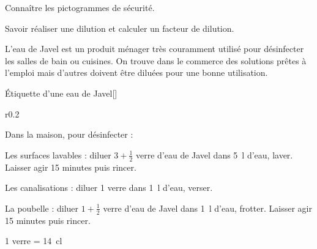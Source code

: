 \tetePremStssChim
\vspace*{-36pt}

\begin{objectifs}
  \item Connaître les pictogrammes de sécurité.
  \item Savoir réaliser une dilution et calculer un facteur de dilution.
\end{objectifs}





\newpage
\vspace*{-30pt}
\begin{contexte}
  L'eau de Javel est un produit ménager très couramment utilisé pour désinfecter les salles de bain ou cuisines.
  On trouve dans le commerce des solutions prêtes à l’emploi mais d’autres
doivent être diluées pour une bonne utilisation.

\end{contexte}

\begin{doc}{Étiquette d'une eau de Javel}[\label{doc:eau_javel}]
  \begin{wrapfigure}{r}{0.2\linewidth}
    \vspace*{-16pt}
    \centering
    ~
  \end{wrapfigure}
  
  Dans la maison, pour désinfecter :
  \begin{listePoints}
    \item Les surfaces lavables : diluer $3 + \frac{1}{2}$ verre d’eau de Javel dans \qty{5}{\litre} d’eau, laver.
    Laisser agir 15 minutes puis rincer.
    \item Les canalisations : diluer 1 verre dans \qty{1}{\litre} d’eau, verser.
    \item La poubelle : diluer $1 + \frac{1}{2}$ verre d’eau de Javel dans \qty{1}{\litre} d’eau, frotter.
    Laisser agir 15 minutes puis rincer.
  \end{listePoints}
  \begin{donnees}
    \item \num{1} verre = \qty{14}{\centi\litre}
  \end{donnees}
\end{doc}

